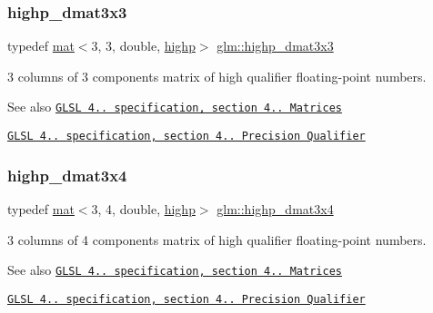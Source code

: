 \subsubsection{\texorpdfstring{highp\+\_\+dmat3x3}{highp\_dmat3x3}}
{\footnotesize\ttfamily typedef \hyperlink{structglm_1_1mat}{mat}$<$3, 3, double, \hyperlink{namespaceglm_a36ed105b07c7746804d7fdc7cc90ff25ac6f7eab42eacbb10d59a58e95e362074}{highp}$>$ \hyperlink{group__core__precision_gae5f677e4437523476511c84a17206ac2}{glm\+::highp\+\_\+dmat3x3}}

3 columns of 3 components matrix of high qualifier floating-\/point numbers.

\begin{DoxySeeAlso}{See also}
\href{http://www.opengl.org/registry/doc/GLSLangSpec.4.20.8.pdf}{\tt G\+L\+SL 4.. specification, section 4.. Matrices} 

\href{http://www.opengl.org/registry/doc/GLSLangSpec.4.20.8.pdf}{\tt G\+L\+SL 4.. specification, section 4.. Precision Qualifier} 
\end{DoxySeeAlso}
\mbox{\label{group__core__precision_ga21d3883c59ff3949404de6713e86c89e}} 
\subsubsection{\texorpdfstring{highp\+\_\+dmat3x4}{highp\_dmat3x4}}
{\footnotesize\ttfamily typedef \hyperlink{structglm_1_1mat}{mat}$<$3, 4, double, \hyperlink{namespaceglm_a36ed105b07c7746804d7fdc7cc90ff25ac6f7eab42eacbb10d59a58e95e362074}{highp}$>$ \hyperlink{group__core__precision_ga21d3883c59ff3949404de6713e86c89e}{glm\+::highp\+\_\+dmat3x4}}

3 columns of 4 components matrix of high qualifier floating-\/point numbers.

\begin{DoxySeeAlso}{See also}
\href{http://www.opengl.org/registry/doc/GLSLangSpec.4.20.8.pdf}{\tt G\+L\+SL 4.. specification, section 4.. Matrices} 

\href{http://www.opengl.org/registry/doc/GLSLangSpec.4.20.8.pdf}{\tt G\+L\+SL 4.. specification, section 4.. Precision Qualifier} 
\end{DoxySeeAlso}
\mbox{\label{group__core__precision_ga878bb8f4881dbf688ab9bbb5e2944a54}} 
